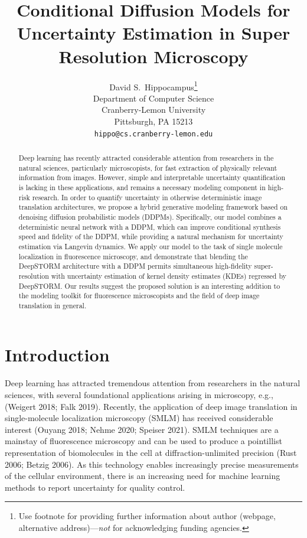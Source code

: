 \documentclass{article}
\title{Conditional Diffusion Models for Uncertainty Estimation in Super Resolution Microscopy}
\author{%
  David S.~Hippocampus\thanks{Use footnote for providing further information
    about author (webpage, alternative address)---\emph{not} for acknowledging
    funding agencies.} \\
  Department of Computer Science\\
  Cranberry-Lemon University\\
  Pittsburgh, PA 15213 \\
  \texttt{hippo@cs.cranberry-lemon.edu} \\
}
\begin{document}
\maketitle


\begin{abstract}

Deep learning has recently attracted considerable attention from researchers in the natural sciences, particularly microscopists, for fast extraction of physically relevant information from images. However, simple and interpretable uncertainty quantification is lacking in these applications, and remains a necessary modeling component in high-risk research. In order to quantify uncertainty in otherwise deterministic image translation architectures, we propose a hybrid generative modeling framework based on denoising diffusion probabilistic models (DDPMs). Specifically, our model combines a deterministic neural network with a DDPM, which can improve conditional synthesis speed and fidelity of the DDPM, while providing a natural mechanism for uncertainty estimation via Langevin dynamics. We apply our model to the task of single molecule localization in fluorescence microscopy, and demonstrate that blending the DeepSTORM architecture with a DDPM permits simultaneous high-fidelity super-resolution with uncertainty estimation of kernel density estimates (KDEs) regressed by DeepSTORM. Our results suggest the proposed solution is an interesting addition to the modeling toolkit for fluorescence microscopists and the field of deep image translation in general.
\end{abstract}

\section{Introduction}

Deep learning has attracted tremendous attention from researchers in the natural sciences, with several foundational applications arising in microscopy, e.g., (Weigert 2018; Falk 2019). Recently, the application of deep image translation in single-molecule localization microscopy (SMLM) has received considerable interest (Ouyang 2018; Nehme 2020; Speiser 2021). SMLM techniques are a mainstay of fluorescence microscopy and can be used to produce a pointillist representation of biomolecules in the cell at diffraction-unlimited precision (Rust 2006; Betzig 2006). As this technology enables increasingly precise measurements of the cellular environment, there is an increasing need for machine learning methods to report uncertainty for quality control.  
\end{document}
